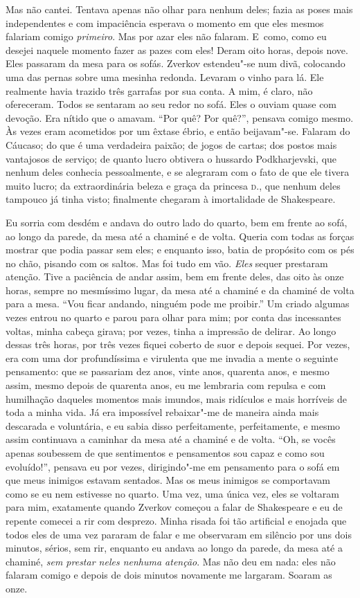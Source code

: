 Mas não cantei. Tentava apenas não olhar para nenhum deles; fazia as
poses mais independentes e com impaciência esperava o momento em que
eles mesmos falariam comigo \textit{primeiro}. Mas por azar eles não
falaram. \mbox{E como}, como eu desejei naquele momento fazer as pazes com
eles! Deram oito horas, depois nove. Eles passaram da mesa para os
sofás. Zverkov estendeu"-se num divã, colocando uma das pernas sobre uma
mesinha redonda. Levaram o vinho para lá. Ele realmente havia trazido
três garrafas por sua conta. A mim, é claro, não ofereceram. Todos se
sentaram ao seu redor no sofá. Eles o ouviam quase com devoção. Era
nítido que o amavam. ``Por quê? Por quê?'', pensava comigo mesmo. Às
vezes eram acometidos por um êxtase ébrio, e então beijavam"-se. Falaram
do Cáucaso; do que é uma verdadeira paixão; de jogos de cartas; dos
postos mais vantajosos de serviço; de quanto lucro obtivera o hussardo
Podkharjevski, que nenhum deles conhecia pessoalmente, e se alegraram
com o fato de que ele tivera muito lucro; da extraordinária beleza e
graça da princesa \textsc{d.}, que nenhum deles tampouco já tinha visto;
finalmente chegaram à imortalidade de Shakespeare.

Eu sorria com desdém e andava do outro lado do quarto, bem em frente ao sofá,
ao longo da parede, da mesa até a chaminé e de volta. Queria com todas as
forças mostrar que podia passar sem eles; e enquanto isso, batia de propósito
com os pés no chão, pisando com os saltos. Mas foi tudo em vão. \textit{Eles}
sequer prestaram atenção. Tive a paciência de andar assim, bem em frente deles,
das oito às onze horas, sempre no mesmíssimo lugar, da mesa até a chaminé e da
chaminé de volta para a mesa. ``Vou ficar andando, ninguém pode me proibir.'' Um
criado algumas vezes entrou no quarto e parou para olhar para mim; por conta
das incessantes voltas, minha cabeça girava; por vezes, tinha a impressão de
delirar. Ao longo dessas três horas, por três vezes fiquei coberto de suor e
depois sequei. Por vezes, era com uma dor profundíssima e virulenta que me
invadia a mente o seguinte pensamento: que se passariam dez anos, vinte anos,
quarenta anos, e mesmo assim, mesmo depois de quarenta anos, eu me lembraria
com repulsa e com humilhação daqueles momentos mais imundos, mais ridículos e
mais horríveis de toda a minha vida. Já era impossível rebaixar"-me de maneira
ainda mais descarada e voluntária, e eu sabia disso perfeitamente,
perfeitamente, e mesmo assim continuava a caminhar da mesa até a chaminé e de
volta.  ``Oh, se vocês apenas soubessem de que sentimentos e pensamentos sou
capaz e como sou evoluído!'', pensava eu por vezes, dirigindo"-me em pensamento
para o sofá em que meus inimigos estavam sentados. Mas os meus inimigos se
comportavam como se eu nem estivesse no quarto. Uma vez, uma única vez, eles se
voltaram para mim, exatamente quando Zverkov começou a falar de Shakespeare e
eu de repente comecei a rir com desprezo. Minha risada foi tão artificial e
enojada que todos eles de uma vez pararam de falar e me observaram em silêncio
por uns dois minutos, sérios, sem rir, enquanto eu andava ao longo da parede,
da mesa até a chaminé, \textit{sem prestar neles nenhuma atenção}.  Mas não deu
em nada: eles não falaram comigo e depois de dois minutos novamente me
largaram. Soaram as onze.

